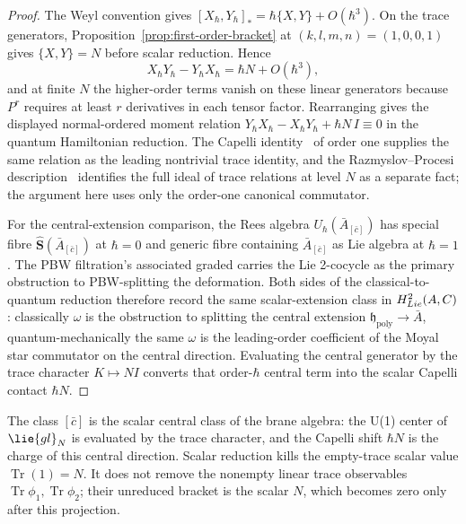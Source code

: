 \documentclass[11pt]{memoir}
\begin{document}
\begin{proof}
  The Weyl convention gives $[X_{\hbar},Y_{\hbar}]_*=\hbar\{X,Y\}+O(\hbar^3)$.
  On the trace generators, Proposition~\ref{prop:first-order-bracket} at
  $(k,l,m,n)=(1,0,0,1)$ gives $\{X,Y\}=N$ before scalar reduction. Hence
  $$X_{\hbar}Y_{\hbar}-Y_{\hbar}X_{\hbar}=\hbar N+O(\hbar^3),$$
  and at finite $N$ the higher-order terms vanish on these linear generators
  because $P^r$ requires at least $r$ derivatives in each tensor factor.
  Rearranging gives the displayed normal-ordered moment relation
  $Y_\hbar X_\hbar-X_\hbar Y_\hbar+\hbar N\,I\equiv0$ in the
  quantum Hamiltonian reduction. The Capelli
  identity~\cites{capelli,howe-capelli} of order one supplies the same
  relation as the leading nontrivial trace identity, and the
  Razmyslov--Procesi description~\cites{razmyslov,procesi} identifies
  the full ideal of trace relations at level $N$ as a separate fact;
  the argument here uses only the order-one canonical commutator.

  For the central-extension comparison, the Rees algebra
  $U_{\hbar}(\bar A_{[\bar c]})$ has special fibre
  $\widehat{\mathbf S}(\bar A_{[\bar c]})$ at $\hbar=0$ and generic fibre
  containing $\bar A_{[\bar c]}$ as Lie algebra at $\hbar=1$. The
  PBW filtration's associated graded carries the Lie 2-cocycle as the
  primary obstruction to PBW-splitting the deformation. Both sides of the
  classical-to-quantum reduction therefore record the same scalar-extension
  class in
  $H^2_{Lie}(A,C)$: classically $\omega$ is the obstruction
  to splitting the central extension $\mathfrak h_{\mathrm{poly}}\to\bar A$,
  quantum-mechanically the same $\omega$ is the leading-order coefficient
  of the Moyal star commutator on the central direction. Evaluating the
  central generator by the trace character \(K\mapsto NI\) converts that
  order-\(\hbar\) central term into the scalar Capelli contact \(\hbar N\).
\end{proof}

\begin{rmk}
  The class $[\bar c]$ is the scalar central class of the brane algebra:
  the U(1) center of $\lie{gl}_N$ is evaluated by the trace character,
  and the Capelli shift $\hbar N$ is the charge of this central direction.
  Scalar reduction kills the empty-trace scalar value
  \(\operatorname{Tr}(1)=N\). It does not remove the nonempty linear trace
  observables \(\operatorname{Tr}\phi_1,\operatorname{Tr}\phi_2\); their
  unreduced bracket is the scalar \(N\), which becomes zero only after this
  projection.
\end{rmk}
\end{document}
